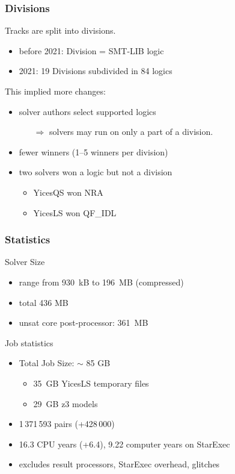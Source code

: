 \documentclass[table]{beamer}
\def\emph#1{\textcolor{MYblue}{#1}}
\begin{document}
\begin{frame}
  \frametitle{Divisions}
  Tracks are split into \emph{divisions}.

  \begin{itemize}
  \item \emph{before 2021}: Division = SMT-LIB logic
  \item \emph{2021}: 19 Divisions subdivided in 84 logics
  \end{itemize}

  This implied more changes:
  \begin{itemize}
  \item solver authors select supported logics
    \begin{itemize}
    \item[$\Rightarrow$] solvers may run on only a part of a division.
    \end{itemize}
  \item fewer winners (1--5 winners per division)
  \item two solvers won a logic but not a division
    \begin{itemize}
    \item YicesQS won NRA
    \item YicesLS won QF\_IDL
    \end{itemize}
  \end{itemize}
\end{frame}

\begin{frame}
  \frametitle{Statistics}
  Solver Size
  \begin{itemize}
  \item range from 930~kB to 196~MB (compressed)
  \item total 436 MB
  \item unsat core post-processor: 361~MB
  \end{itemize}
  \bigskip
  \pause
  
  Job statistics
  \begin{itemize}
  \item Total Job Size: $\sim$ 85 GB
    \begin{itemize}
    \item 35~GB YicesLS temporary files
    \item 29~GB z3 models
    \end{itemize}
  \item 1\,371\,593 pairs (+428\,000)
  \item 16.3 CPU years (+6.4), 9.22 computer years on StarExec
  \item excludes result processors, StarExec overhead, glitches
  \end{itemize}
\end{frame}
\end{document}
